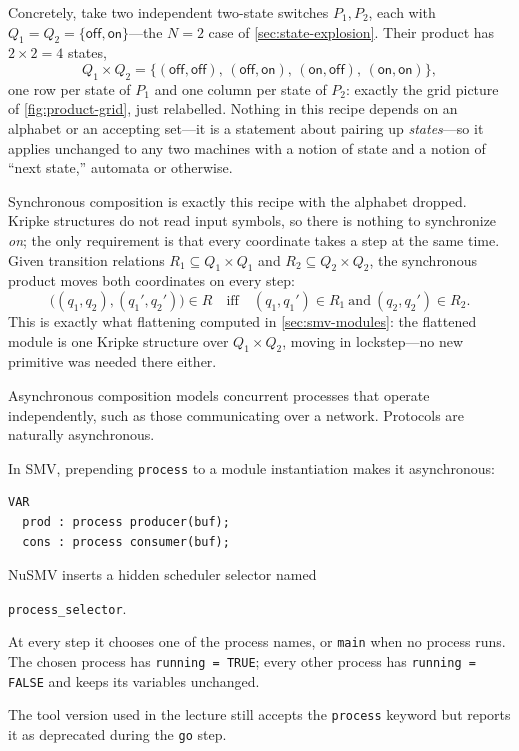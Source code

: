 Concretely, take two independent two-state switches $P_1,P_2$, each with
$Q_1=Q_2=\{\mathsf{off},\mathsf{on}\}$---the $N=2$ case of
\cref{sec:state-explosion}.  Their product has $2\times 2=4$ states,
\[
  Q_1\times Q_2=\bigl\{(\mathsf{off},\mathsf{off}),\,(\mathsf{off},\mathsf{on}),\,
                  (\mathsf{on},\mathsf{off}),\,(\mathsf{on},\mathsf{on})\bigr\},
\]
one row per state of $P_1$ and one column per state of $P_2$: exactly the
grid picture of \cref{fig:product-grid}, just relabelled.  Nothing in this
recipe depends on an alphabet or an accepting set---it is a statement about
pairing up \emph{states}---so it applies unchanged to any two machines with
a notion of state and a notion of ``next state,'' automata or otherwise.

Synchronous composition is exactly this recipe with the alphabet dropped.
Kripke structures do not read input symbols, so there is nothing to
synchronize \emph{on}; the only requirement is that every coordinate takes a
step at the same time.  Given transition relations $R_1\subseteq
Q_1\times Q_1$ and $R_2\subseteq Q_2\times Q_2$, the synchronous product
moves both coordinates on every step:
\[
  \bigl((q_1,q_2),(q_1',q_2')\bigr)\in R
  \quad\text{iff}\quad
  (q_1,q_1')\in R_1 \ \text{and}\ (q_2,q_2')\in R_2 .
\]
This is exactly what flattening computed in \cref{sec:smv-modules}: the
flattened module is one Kripke structure over $Q_1\times Q_2$, moving in
lockstep---no new primitive was needed there either.

Asynchronous composition models concurrent processes that operate
independently, such as those communicating over a network.  Protocols are
naturally asynchronous.

In SMV, prepending \texttt{process} to a module instantiation makes it
asynchronous:
\begin{verbatim}
VAR
  prod : process producer(buf);
  cons : process consumer(buf);
\end{verbatim}

NuSMV inserts a hidden scheduler selector named
\begin{center}
\texttt{process\_selector}.
\end{center}
At every step it chooses one of the process names, or \texttt{main} when no
process runs.  The chosen process has \texttt{running = TRUE}; every other
process has \texttt{running = FALSE} and keeps its variables unchanged.

\begin{remark}
The tool version used in the lecture still accepts the \texttt{process}
keyword but reports it as deprecated during the \texttt{go} step.
\end{remark}

